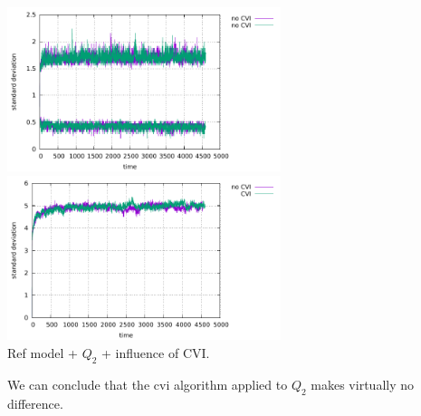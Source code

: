 \begin{center}
\includegraphics[width=8cm]{python_codes/fieldstone_30/results_dh/markercount_cvi_Q2}
\includegraphics[width=8cm]{python_codes/fieldstone_30/results_dh/stdev_cvi_Q2}\\
{\captionfont Ref model + $Q_2$ + influence of CVI.}
\end{center}

We can conclude that the cvi algorithm applied to $Q_2$ makes virtually no difference.
















